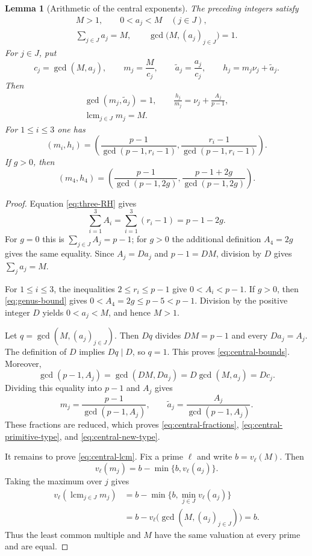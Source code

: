 \documentclass[10pt,a4paper]{amsart}
\newtheorem{lemma}[theorem]{Lemma}
\numberwithin{equation}{section}
\begin{document}
\begin{lemma}[Arithmetic of the central exponents]
\label{lem:central-arithmetic}
The preceding integers satisfy
\begin{gather}
 M>1,\qquad 0<a_j<M\quad(j\in J),\\
 \sum_{j\in J}a_j=M,\qquad
 \gcd\bigl(M,(a_j)_{j\in J}\bigr)=1.
 \label{eq:central-bounds}
\end{gather}
For $j\in J$, put
\[
 c_j=\gcd(M,a_j),\qquad m_j=\frac{M}{c_j},\qquad
 \widetilde a_j=\frac{a_j}{c_j},\qquad
 h_j=m_j\nu_j+\widetilde a_j.
\]
Then
\begin{gather}
 \gcd(m_j,\widetilde a_j)=1,\qquad
 \frac{h_j}{m_j}=\nu_j+\frac{A_j}{p-1},
 \label{eq:central-fractions}\\
 \operatorname{lcm}_{j\in J}m_j=M.
 \label{eq:central-lcm}
\end{gather}
For $1\leq i\leq3$ one has
\begin{equation}\label{eq:central-primitive-type}
 (m_i,h_i)=
 \left(
  \frac{p-1}{\gcd(p-1,r_i-1)},
  \frac{r_i-1}{\gcd(p-1,r_i-1)}
 \right).
\end{equation}
If $g>0$, then
\begin{equation}\label{eq:central-new-type}
 (m_4,h_4)=
 \left(
  \frac{p-1}{\gcd(p-1,2g)},
  \frac{p-1+2g}{\gcd(p-1,2g)}
 \right).
\end{equation}
\end{lemma}

\begin{proof}
Equation \eqref{eq:three-RH} gives
\[
 \sum_{i=1}^{3}A_i
 =\sum_{i=1}^{3}(r_i-1)=p-1-2g.
\]
For $g=0$ this is $\sum_{j\in J}A_j=p-1$; for $g>0$ the additional
definition $A_4=2g$ gives the same equality.  Since $A_j=Da_j$ and
$p-1=DM$, division by $D$ gives $\sum_j a_j=M$.

For $1\leq i\leq3$, the inequalities $2\leq r_i\leq p-1$ give
$0<A_i<p-1$.  If $g>0$, then \eqref{eq:genus-bound} gives
$0<A_4=2g\leq p-5<p-1$.  Division by the positive integer $D$ yields
$0<a_j<M$, and hence $M>1$.

Let $q=\gcd(M,(a_j)_{j\in J})$.  Then $Dq$ divides $DM=p-1$ and every
$Da_j=A_j$.  The definition of $D$ implies $Dq\mid D$, so $q=1$.  This
proves \eqref{eq:central-bounds}.  Moreover,
\[
 \gcd(p-1,A_j)=\gcd(DM,Da_j)=D\gcd(M,a_j)=Dc_j.
\]
Dividing this equality into $p-1$ and $A_j$ gives
\[
 m_j=\frac{p-1}{\gcd(p-1,A_j)},\qquad
 \widetilde a_j=\frac{A_j}{\gcd(p-1,A_j)}.
\]
These fractions are reduced, which proves
\eqref{eq:central-fractions}, \eqref{eq:central-primitive-type}, and
\eqref{eq:central-new-type}.

It remains to prove \eqref{eq:central-lcm}.  Fix a prime $\ell$ and write
$b=v_\ell(M)$.  Then
\[
 v_\ell(m_j)=b-\min\{b,v_\ell(a_j)\}.
\]
Taking the maximum over $j$ gives
\begin{align*}
 v_\ell\left(\operatorname{lcm}_{j\in J}m_j\right)
 &=b-\min\bigl\{b,\min_{j\in J}v_\ell(a_j)\bigr\}\\
 &=b-v_\ell\bigl(\gcd(M,(a_j)_{j\in J})\bigr)=b.
\end{align*}
Thus the least common multiple and $M$ have the same valuation at every
prime and are equal.
\end{proof}
\end{document}
